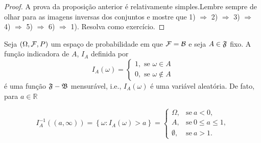 \begin{frame}
\begin{proof}
	A prova da proposição anterior é relativamente simples.Lembre sempre de olhar para as imagens inversas dos conjuntos e  mostre que 1) $\Rightarrow$ 2) $\Rightarrow$ 3) $\Rightarrow$ 4) $\Rightarrow$ 5) $\Rightarrow$ 6) $\Rightarrow$ 1). Resolva como exercício.
\end{proof}

\begin{exem}
Seja $(\Omega, {\cal F}, P)$ um espaço de probabilidade em que ${\cal F} = {\cal
B}$ e seja $A\in \frak{F}$ fixo. A função indicadora de $A$, $I_{A}$ definida por
\begin{equation*}
I_{A}\left( \omega \right) =\left\{ 
\begin{array}{c}
1,\text{ se }\omega \in A \\ 
0,\text{ se }\omega \notin A
\end{array}
\right.
\end{equation*}
é uma função $\frak{F-B}$ mensurável, i.e., $I_{A}\left( \omega \right)$ é uma
variável aleatória. De fato, para $a\in \mathbb{R}$

\begin{equation*}
I_{A}^{-1}\left( \left( a,\infty \right) \right) =\left\{ \omega
:I_{A}\left( \omega \right) >a\right\} =
\begin{cases}
\Omega, & \text{se} \ a<0, \\ 
A, & \text{se} \  0\leq a\leq 1,\\ 
\emptyset, &\text{se} \ a>1.
\end{cases}
\end{equation*}
\end{exem}
\end{frame}

%
%
